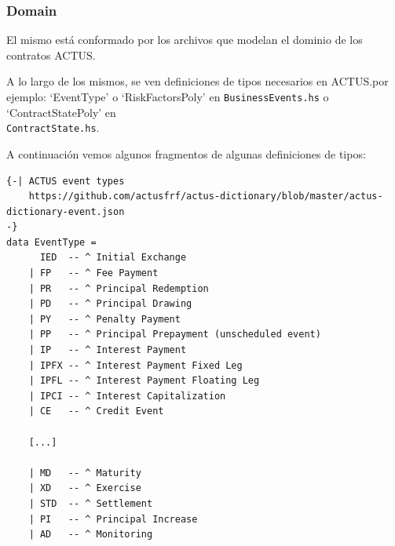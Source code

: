 \documentclass[12pt]{book}
\begin{document}
\subsubsection{Domain}

El mismo está conformado por los archivos que modelan el dominio de los contratos ACTUS.\@


A lo largo de los mismos, se ven definiciones de tipos necesarios en ACTUS.\@Como por ejemplo: `EventType' o `RiskFactorsPoly' en \texttt{BusinessEvents.hs} o `ContractStatePoly' en\\ \texttt{ContractState.hs}.

A continuación vemos algunos fragmentos de algunas definiciones de tipos:

\begin{lstlisting}[style=Haskell-cardano, caption=Algunos tipos de eventos]
{-| ACTUS event types
    https://github.com/actusfrf/actus-dictionary/blob/master/actus-dictionary-event.json
-}
data EventType =
      IED  -- ^ Initial Exchange
    | FP   -- ^ Fee Payment
    | PR   -- ^ Principal Redemption
    | PD   -- ^ Principal Drawing
    | PY   -- ^ Penalty Payment
    | PP   -- ^ Principal Prepayment (unscheduled event)
    | IP   -- ^ Interest Payment
    | IPFX -- ^ Interest Payment Fixed Leg
    | IPFL -- ^ Interest Payment Floating Leg
    | IPCI -- ^ Interest Capitalization
    | CE   -- ^ Credit Event

    [...]

    | MD   -- ^ Maturity
    | XD   -- ^ Exercise
    | STD  -- ^ Settlement
    | PI   -- ^ Principal Increase
    | AD   -- ^ Monitoring
\end{lstlisting}
\end{document}
